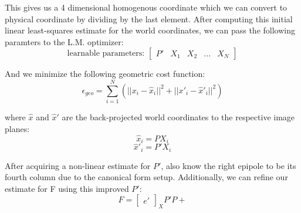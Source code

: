 \documentclass{article}
\begin{document}
This gives us a 4 dimensional homogenous coordinate which we can convert to physical coordinate by dividing by the last element.
After computing this initial linear least-squares estimate for the world coordinates, we can pass the following paramters to the L.M. optimizer:
\[\text{learnable parameters: } \begin{bmatrix}P' & X_1 & X_2 & ... & X_N \end{bmatrix}\]

And we minimize the following geometric cost function:
\[ \epsilon_{geo} = \sum_{i=1}^N \left(||x_i - \hat{x}_i||^2 + ||x'_i - \hat{x}'_i||^2\right)\]

where $\hat{x}$ and $\hat{x}'$ are the back-projected world coordinates to the respective image planes:
\[\hat{x}_i = P X_i\]
\[\hat{x}'_i = P' X_i\]


After acquiring a non-linear estimate for $P'$, also know the right epipole to be its fourth column due to the canonical form setup.
Additionally, we can refine our estimate for F using this improved $P'$:
\[F = \begin{bmatrix} e' \end{bmatrix}_X P' P+\]
\end{document}
